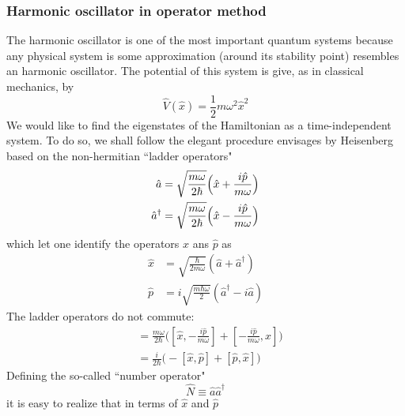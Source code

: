 \subsubsection{Harmonic oscillator in operator method}
The harmonic oscillator is one of the most important quantum
systems because any physical system is some approximation
(around its stability point) resembles an harmonic
oscillator. The potential of this system is give, as in
classical mechanics, by 
\begin{equation}
  \hat{V}(\hat{x}) = \frac{1}{2} m \omega^2 \hat{x}^2
  \label{equ:2.67}
\end{equation}
We would like to find the eigenstates of the Hamiltonian as
a time-independent system. To do so, we shall follow the
elegant procedure envisages by Heisenberg based on the
non-hermitian ``ladder operators"
\begin{subequations}
  \begin{align}
    \hat{a}&=\sqrt{\frac{m\omega}{2\hbar}}\Bigl(\hat{x}+\frac{i\hat{p}}{m\omega}\Bigr)\label{equ:2.68a}\\
    \hat{a}^{\dagger}&=\sqrt{\frac{m\omega}{2\hbar}}\Bigl(\hat{x}-\frac{i\hat{p}}{m\omega}\Bigr)\label{equ:2.68b}
  \end{align}
\end{subequations}
which let one identify the operators $\hat{x}$ ans $\hat{p}$
as
\begin{subequations}
  \begin{align}
    \hat{x} &=
    \sqrt{\frac{\hbar}{2m\omega}}(\hat{a}+\hat{a}^{\dagger})\label{equ:2.69a}\\
    \hat{p} &=
    i\sqrt{\frac{m\hbar \omega}{2}}(\hat{a}^{\dagger}-i\hat{a})\label{equ:2.69b}
  \end{align}
\end{subequations}
The ladder operators do not commute:
\begin{align}
  [\hat{a}, \hat{a}^{\dagger}] &= \frac{m\omega}{2\hbar}
  \biggl([\hat{x},-\frac{i\hat{p}}{m\omega}]+[-\frac{i\hat{p}}{m\omega},\hat{x}]\biggr)
  \nonumber\\
  &= \frac{i}{2\hbar}\biggl(
  -[\hat{x},\hat{p}]+[\hat{p},\hat{x}]
  \biggr)\label{equ:2.70}
\end{align}
Defining the so-called ``number operator"
\begin{equation}
  \hat{N} \equiv \hat{a}\hat{a}^{\dagger}
  \label{equ:2.71}
\end{equation}
it is easy to realize that in terms of $\hat{x}$ and
$\hat{p}$

